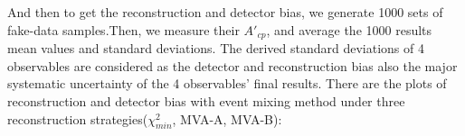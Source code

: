 		\begin{figure}[H]
		\centering{}
	    	\\
		\end{figure}
		\FloatBarrier
		\begin{figure}[H]
		\centering{}
	    	\\
		\caption{}
		\label{AsymBias:fig:washout_artificial}
		\end{figure}
		\FloatBarrier

		And then to get the reconstruction and detector bias, we generate 1000 sets of fake-data samples.Then, we measure their $A'_{cp}$, and average the 1000 results mean values and standard deviations. The derived standard deviations of 4 observables are considered as the detector and reconstruction bias also the major systematic uncertainty of the 4 observables' final results. There are the plots of reconstruction and detector bias with event mixing method under three reconstruction strategies($\chi^2_{min}$, MVA-A, MVA-B):

